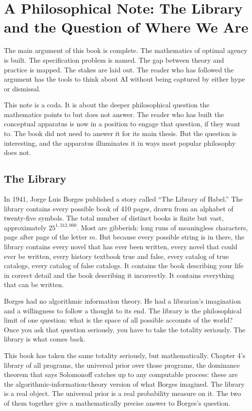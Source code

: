 \chapter*{A Philosophical Note: The Library and the Question of Where We Are}

The main argument of this book is complete. The mathematics of optimal agency is built. The specification problem is named. The gap between theory and practice is mapped. The stakes are laid out. The reader who has followed the argument has the tools to think about AI without being captured by either hype or dismissal.

This note is a coda. It is about the deeper philosophical question the mathematics points to but does not answer. The reader who has built the conceptual apparatus is now in a position to engage that question, if they want to. The book did not need to answer it for its main thesis. But the question is interesting, and the apparatus illuminates it in ways most popular philosophy does not.

\section*{The Library}

In 1941, Jorge Luis Borges published a story called ``The Library of Babel.'' The library contains every possible book of 410 pages, drawn from an alphabet of twenty-five symbols. The total number of distinct books is finite but vast, approximately $25^{1{,}312{,}000}$. Most are gibberish: long runs of meaningless characters, page after page of the letter $m$. But because every possible string is in there, the library contains every novel that has ever been written, every novel that could ever be written, every history textbook true and false, every catalog of true catalogs, every catalog of false catalogs. It contains the book describing your life in correct detail and the book describing it incorrectly. It contains everything that can be written.

Borges had no algorithmic information theory. He had a librarian's imagination and a willingness to follow a thought to its end. The library is the philosophical limit of one question: what is the space of all possible accounts of the world? Once you ask that question seriously, you have to take the totality seriously. The library is what comes back.

This book has taken the same totality seriously, but mathematically. Chapter 4's library of all programs, the universal prior over those programs, the dominance theorem that says Solomonoff catches up to any computable process: these are the algorithmic-information-theory version of what Borges imagined. The library is a real object. The universal prior is a real probability measure on it. The two of them together give a mathematically precise answer to Borges's question.

